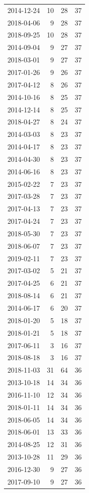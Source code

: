 \begin{tabular}{lrrr}
2014-12-24 & 10 & 28 & 37 \\
2018-04-06 & 9 & 28 & 37 \\
2018-09-25 & 10 & 28 & 37 \\
2014-09-04 & 9 & 27 & 37 \\
2018-03-01 & 9 & 27 & 37 \\
2017-01-26 & 9 & 26 & 37 \\
2017-04-12 & 8 & 26 & 37 \\
2014-10-16 & 8 & 25 & 37 \\
2014-12-14 & 8 & 25 & 37 \\
2018-04-27 & 8 & 24 & 37 \\
2014-03-03 & 8 & 23 & 37 \\
2014-04-17 & 8 & 23 & 37 \\
2014-04-30 & 8 & 23 & 37 \\
2014-06-16 & 8 & 23 & 37 \\
2015-02-22 & 7 & 23 & 37 \\
2017-03-28 & 7 & 23 & 37 \\
2017-04-13 & 7 & 23 & 37 \\
2017-04-24 & 7 & 23 & 37 \\
2018-05-30 & 7 & 23 & 37 \\
2018-06-07 & 7 & 23 & 37 \\
2019-02-11 & 7 & 23 & 37 \\
2017-03-02 & 5 & 21 & 37 \\
2017-04-25 & 6 & 21 & 37 \\
2018-08-14 & 6 & 21 & 37 \\
2014-06-17 & 6 & 20 & 37 \\
2018-01-20 & 5 & 18 & 37 \\
2018-01-21 & 5 & 18 & 37 \\
2017-06-11 & 3 & 16 & 37 \\
2018-08-18 & 3 & 16 & 37 \\
2018-11-03 & 31 & 64 & 36 \\
2013-10-18 & 14 & 34 & 36 \\
2016-11-10 & 12 & 34 & 36 \\
2018-01-11 & 14 & 34 & 36 \\
2018-06-05 & 14 & 34 & 36 \\
2018-06-01 & 13 & 33 & 36 \\
2014-08-25 & 12 & 31 & 36 \\
2013-10-28 & 11 & 29 & 36 \\
2016-12-30 & 9 & 27 & 36 \\
2017-09-10 & 9 & 27 & 36 \\

\end{tabular}
